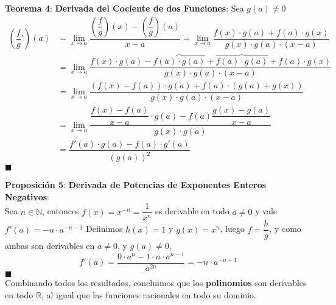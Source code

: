 \documentclass[11pt,a4paper]{article}
\newcommand*{\QEDA}{\null\nobreak\hfill\ensuremath{\blacksquare}}
\begin{document}
\noindent \textbf{Teorema 4}: \textbf{Derivada del Cociente de dos Funciones}: Sea $g(a)\not=0$
\begin{align*}
\left(\dfrac{f}{g}'\right)(a) 
& = \displaystyle{\lim_{x \to a} \dfrac{\left(\dfrac{f}{g}\right)(x) - \left(\dfrac{f}{g}\right)(a)}{x-a}}
  = \displaystyle{\lim_{x \to a} \dfrac{f(x) \cdot g(a) + f(a) \cdot g(x)}{g(x) \cdot g(a) \cdot (x-a)}}\\
& = \displaystyle{\lim_{x \to a} \dfrac{f(x) \cdot g(a) - \overbrace{f(a) \cdot g(a)} + \overbrace{f(a) \cdot g(a)} + f(a) \cdot g(x)}{g(x) \cdot g(a) \cdot (x-a)}}\\
& = \displaystyle{\lim_{x \to a} \dfrac{(f(x) - f(a)) \cdot g(a) + f(a) \cdot (g(a) + g(x))}{g(x) \cdot g(a) \cdot (x-a)}}\\
& = \displaystyle{\lim_{x \to a} \dfrac{\dfrac{f(x)-f(a)}{x-a} \cdot g(a) - f(a) \dfrac{g(x)-g(a)}{x-a}}{g(x) \cdot g(a)} }\\
& = \dfrac{f'(a) \cdot g(a) - f(a) \cdot g'(a)}{(g(a))^2}
\end{align*}
\QEDA

\noindent \textbf{Proposici\'on 5}: \textbf{Derivada de Potencias de Exponentes Enteros Negativos}: \\
Sea $n \in \mathbb{N}$, entonces $f(x)=x^{-n} = \dfrac{1}{x^n}$ es derivable en todo $a\not=0$ y vale $f'(a)=-n\cdot a^{-n-1}$
Definimos $h(x)=1$ y $g(x)=x^n$, luego $f=\dfrac{h}{g}$, y como ambas son derivables en $a\not=0$, y $g(a)\not=0$,\\
$$f'(a) = \dfrac{0\cdot a^n - 1 \cdot n\cdot a^{n-1}}{a^{2n}} = -n\cdot a^{-n-1}$$
\QEDA\\

\noindent Combinando todos los resultados, concluimos que los \textbf{polinomios} son derivables en todo $\mathbb{R}$, al igual que las funciones racionales en todo su dominio.\\

\newpage
\end{document}
